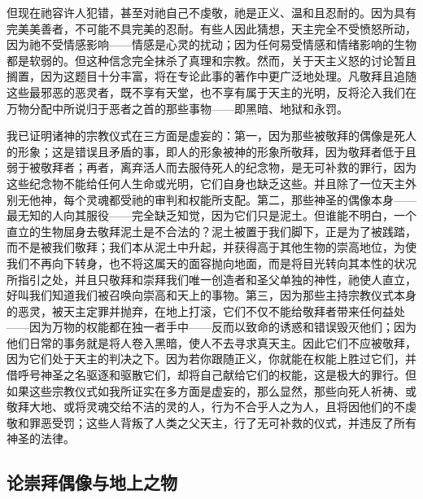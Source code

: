 \par

但现在祂容许人犯错，甚至对祂自己不虔敬，祂是正义、温和且忍耐的。因为具有完美美善者，不可能不具完美的忍耐。有些人因此猜想，天主完全不受愤怒所动，因为祂不受情感影响——情感是心灵的扰动；因为任何易受情感和情绪影响的生物都是软弱的。但这种信念完全抹杀了真理和宗教。然而，关于天主义怒的讨论暂且搁置，因为这题目十分丰富，将在专论此事的著作中更广泛地处理。凡敬拜且追随这些最邪恶的恶灵者，既不享有天堂，也不享有属于天主的光明，反将沦入我们在万物分配中所说归于恶者之首的那些事物——即黑暗、地狱和永罚。\par

我已证明诸神的宗教仪式在三方面是虚妄的：第一，因为那些被敬拜的偶像是死人的形象；这是错误且矛盾的事，即人的形象被神的形象所敬拜，因为敬拜者低于且弱于被敬拜者；再者，离弃活人而去服侍死人的纪念物，是无可补救的罪行，因为这些纪念物不能给任何人生命或光明，它们自身也缺乏这些。并且除了一位天主外别无他神，每个灵魂都受祂的审判和权能所支配。第二，那些神圣的偶像本身——最无知的人向其服役——完全缺乏知觉，因为它们只是泥土。但谁能不明白，一个直立的生物屈身去敬拜泥土是不合法的？泥土被置于我们脚下，正是为了被践踏，而不是被我们敬拜；我们本从泥土中升起，并获得高于其他生物的崇高地位，为使我们不再向下转身，也不将这属天的面容抛向地面，而是将目光转向其本性的状况所指引之处，并且只敬拜和崇拜我们唯一创造者和圣父单独的神性，祂使人直立，好叫我们知道我们被召唤向崇高和天上的事物。第三，因为那些主持宗教仪式本身的恶灵，被天主定罪并抛弃，在地上打滚，它们不仅不能给敬拜者带来任何益处——因为万物的权能都在独一者手中——反而以致命的诱惑和错误毁灭他们；因为他们日常的事务就是将人卷入黑暗，使人不去寻求真天主。因此它们不应被敬拜，因为它们处于天主的判决之下。因为若你跟随正义，你就能在权能上胜过它们，并借呼号神圣之名驱逐和驱散它们，却将自己献给它们的权能，这是极大的罪行。但如果这些宗教仪式如我所证实在多方面是虚妄的，那么显然，那些向死人祈祷、或敬拜大地、或将灵魂交给不洁的灵的人，行为不合乎人之为人，且将因他们的不虔敬和罪恶受罚；这些人背叛了人类之父天主，行了无可补救的仪式，并违反了所有神圣的法律。\par


\subsection{论崇拜偶像与地上之物}

